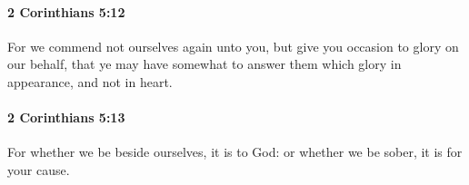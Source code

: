 		\paragraph{2 Corinthians 5:12} %
			\label{2CORINTHIANS-5-12}

			For we commend not ourselves again unto you, but give you occasion to glory on our behalf, that ye may have somewhat to answer them which glory in appearance, and not in heart.

			\begin{framed}
			\scriptsize
				\begin{compactdesc}
					\item[SBLG] 
				\end{compactdesc}
			\end{framed}

		\paragraph{2 Corinthians 5:13} %
			\label{2CORINTHIANS-5-13}

			For whether we be beside ourselves, it is to God: or whether we be sober, it is for your cause.

